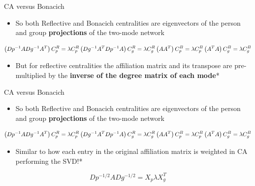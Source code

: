 \documentclass[
  ignorenonframetext,
]{beamer}
\providecommand{\tightlist}{%
  \setlength{\itemsep}{0pt}\setlength{\parskip}{0pt}}\usepackage{longtable,booktabs,array}
\begin{document}
\begin{frame}{CA versus Bonacich}
\protect\hypertarget{ca-versus-bonacich-1}{}
\begin{itemize}
\tightlist
\item
  So both Reflective and Bonacich centralities are eigenvectors of the
  person and group \textbf{projections} of the two-mode network
\end{itemize}

\[
\left(Dp^{-1}ADg^{-1}A^T\right)C^R_p = \lambda C^R_p
\\
\left(Dg^{-1}A^TDp^{-1}A\right)C^R_g = \lambda C^R_g
\\
\left(AA^T\right)C^B_p = \lambda C^B_p
\\
\left(A^TA\right)C^B_g = \lambda C^B_g
\]

\begin{itemize}
\tightlist
\item
  But for reflective centralities the affiliation matrix and its
  transpose are pre-multiplied by the \textbf{inverse of the degree
  matrix of each mode}*
\end{itemize}

\marginnote{\begin{footnotesize}

\begin{itemize}
\tightlist
\item
  van Dam et al.~2021
\end{itemize}

\end{footnotesize}}
\end{frame}

\begin{frame}{CA versus Bonacich}
\protect\hypertarget{ca-versus-bonacich-2}{}
\begin{itemize}
\tightlist
\item
  So both Reflective and Bonacich centralities are eigenvectors of the
  person and group \textbf{projections} of the two-mode network
\end{itemize}

\[
\left(Dp^{-1}ADg^{-1}A^T\right)C^R_p = \lambda C^R_p
\\
\left(Dg^{-1}A^TDp^{-1}A\right)C^R_g = \lambda C^R_g
\\
\left(AA^T\right)C^B_p = \lambda C^B_p
\\
\left(A^TA\right)C^B_g = \lambda C^B_g
\]

\begin{itemize}
\tightlist
\item
  Similar to how each entry in the original affiliation matrix is
  weighted in CA performing the SVD!*
\end{itemize}

\[
Dp^{-1/2}ADg^{-1/2} = X_p \lambda X_g^T
\]

\end{frame}
\end{document}
